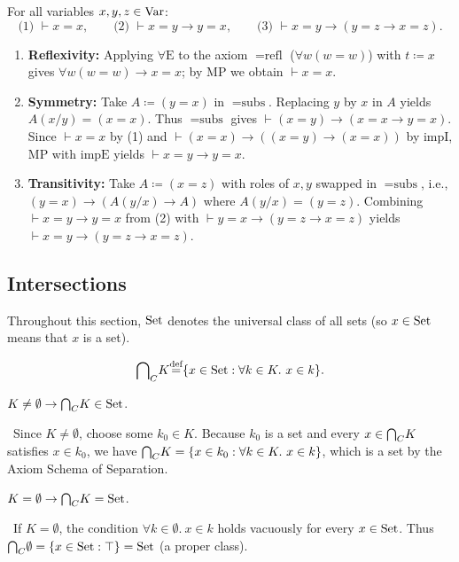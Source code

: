 \documentclass[10pt,a4paper]{article}
\begin{document}
\begin{theorem}
For all variables $x, y, z \in {\textrm{Var}}$:
$$\text{(1) } \vdash x = x, \qquad \text{(2) } \vdash x = y \to y = x, \qquad \text{(3) } \vdash x = y \to (y = z \to x = z).$$
\end{theorem}
\myprf
\begin{enumerate}
\item \textbf{Reflexivity:} Applying $\forall\textrm{E}$ to the axiom $=\textrm{refl}$ ($\forall w(w=w)$) with $t \coloneqq x$ gives $\forall w(w=w) \to x=x$; by $\textrm{MP}$ we obtain $\vdash x = x$.
\item \textbf{Symmetry:} Take $A \coloneqq (y = x)$ in $=\textrm{subs}$. Replacing $y$ by $x$ in $A$ yields $A(x/y) = (x = x)$. Thus $=\textrm{subs}$ gives $\vdash (x = y) \to (x = x \to y = x)$. Since $\vdash x = x$ by (1) and $\vdash (x = x) \to ((x = y) \to (x = x))$ by $\textrm{impI}$, $\textrm{MP}$ with $\textrm{impE}$ yields $\vdash x = y \to y = x$.
\item \textbf{Transitivity:} Take $A \coloneqq (x = z)$ with roles of $x, y$ swapped in $=\textrm{subs}$, i.e., $(y = x) \to (A(y/x) \to A)$ where $A(y/x) = (y = z)$. Combining $\vdash x = y \to y = x$ from (2) with $\vdash y = x \to (y = z \to x = z)$ yields $\vdash x = y \to (y = z \to x = z)$.
\end{enumerate}
\myqed

\subsection{Intersections}
Throughout this section, ${\textrm{Set}}$ denotes the universal class of all sets (so $x \in {\textrm{Set}}$ means that $x$ is a set).

\begin{definition}
$${{\bigcap}_C} K {\stackrel{{\textrm{def}}}{=}} \{x \in {\textrm{Set}} : \forall k\in K.\ x\in k\}.$$
\end{definition}

\begin{exercise}
$K\neq \emptyset \to {{\bigcap}_C} K \in {\textrm{Set}}$.
\end{exercise}
\myprf\ Since $K \neq \emptyset$, choose some $k_0 \in K$. Because $k_0$ is a set and every $x \in {{\bigcap}_C} K$ satisfies $x \in k_0$, we have ${{\bigcap}_C} K = \{x \in k_0 : \forall k\in K.\ x\in k\}$, which is a set by the Axiom Schema of Separation. \myqed

\begin{exercise}
$K=\emptyset \to {{\bigcap}_C} K = {\textrm{Set}}$.
\end{exercise}
\myprf\ If $K = \emptyset$, the condition $\forall k \in \emptyset.\ x \in k$ holds vacuously for every $x \in {\textrm{Set}}$. Thus ${{\bigcap}_C} \emptyset = \{x \in {\textrm{Set}} : \top\} = {\textrm{Set}}$ (a proper class). \myqed
\end{document}

